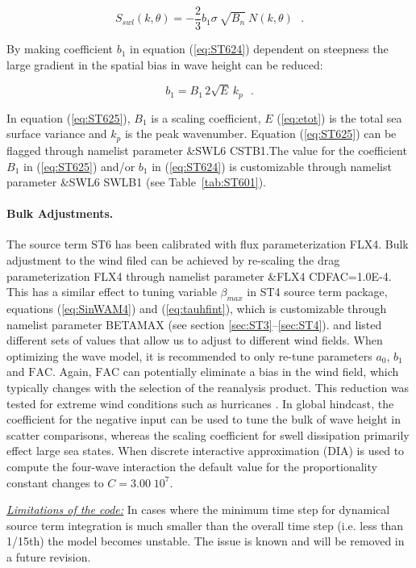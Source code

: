 \begin{equation}\label{eq:ST624}
  S_{swl}(k,\theta) = -\frac{2}{3}b_1 \sigma\ \sqrt{B_n}\ N(k,\theta) \:\:\:.
\end{equation}

\noindent
By making coefficient $b_1$ in equation (\ref{eq:ST624}) dependent
on steepness the large gradient in the spatial bias in wave height
can be reduced:

\begin{equation}\label{eq:ST625}
   b_1 = B_1 \, 2\sqrt{E}\,k_p \:\:\:.
\end{equation}

In equation (\ref{eq:ST625}), $B_1$ is a scaling coefficient,
$E$ (\ref{eq:etot}) is the total sea surface variance  and $k_p$
is the peak wavenumber.  Equation (\ref{eq:ST625}) can be
flagged through namelist parameter {\code \&SWL6 CSTB1}.The value for the
coefficient $B_1$ in (\ref{eq:ST625}) and/or $b_1$ in (\ref{eq:ST624})
is customizable through namelist parameter {\code \&SWL6 SWLB1}
(see Table~\ref{tab:ST601}).

\noindent
\paragraph{Bulk Adjustments.} The source term
{\code ST6} has been calibrated with flux parameterization {\code FLX4}.
Bulk adjustment to the wind filed can be achieved by re-scaling the drag
parameterization {\code FLX4} through namelist parameter {\code
\&FLX4 CDFAC=1.0E-4}.  This has a similar effect to tuning variable
$\beta_{max}$ in {\code ST4} source term package, equations
(\ref{eq:SinWAM4}) and (\ref{eq:tauhfint}), which is customizable
through namelist parameter {\code BETAMAX} (see section
\ref{sec:ST3}--\ref{sec:ST4}). \citet{pro:Aea11} and \citet{art:RA13}
listed different sets of values that allow us to adjust to different
wind fields. When optimizing the wave model, it is recommended to
only re-tune parameters $a_0$, $b_1$ and $\mathrm{FAC}$. Again, $\mathrm{FAC}$
can potentially eliminate a bias in the wind field, which typically changes
with the selection of the reanalysis product. This reduction was tested
for extreme wind conditions such as hurricanes \citep{art:ZBRY15}.  In global
hindcast, the coefficient for the negative input can be used to tune
the bulk of wave height in scatter comparisons, whereas the scaling
coefficient for swell dissipation primarily effect large sea states.
When discrete interactive approximation (DIA) is used to compute the four-wave
interaction the default value for the proportionality constant changes to
$C=3.00\;10^7$.

\textrm{\textit{\underline{Limitations of the code:}}} In cases where the
minimum time step for dynamical source term integration is much smaller
than the overall time step (i.e. less than 1/15th) the model becomes unstable.
The issue is known and will be removed in a future revision.
